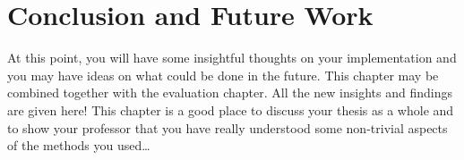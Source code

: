 \chapter{Conclusion and Future Work}
\label{chapter:discussion}

At this point, you will have some insightful thoughts on your
implementation and you may have ideas on what could be done in the
future. This chapter may be combined together with the evaluation
chapter. All the new insights and findings are given here!  This
chapter is a good place to discuss your thesis as a whole and to show
your professor that you have really understood some non-trivial
aspects of the methods you used\ldots

